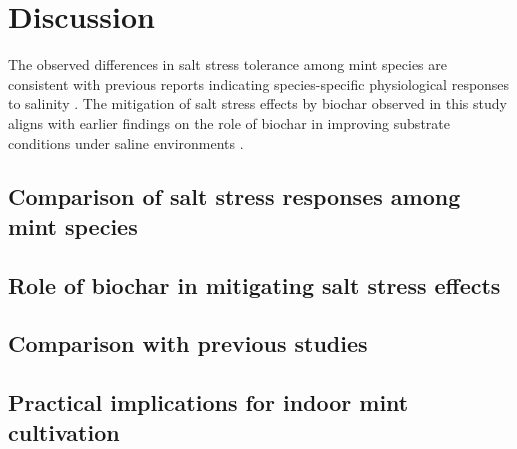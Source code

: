 \chapter{Discussion}

The observed differences in salt stress tolerance among mint species are consistent with previous reports indicating species-specific physiological responses to salinity \textcite{Singh2022}. The mitigation of salt stress effects by biochar observed in this study aligns with earlier findings on the role of biochar in improving substrate conditions under saline environments \textcite{Joseph2021, Haider2022}.

\section{Comparison of salt stress responses among mint species}

\section{Role of biochar in mitigating salt stress effects}

\section{Comparison with previous studies}

\section{Practical implications for indoor mint cultivation}
